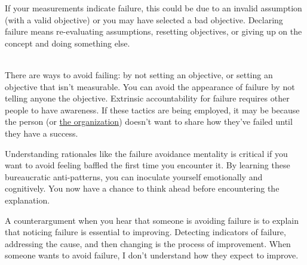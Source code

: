 If your measurements indicate failure, this could be due to an invalid assumption (with a valid objective) or you may have selected a bad objective. Declaring failure means re-evaluating assumptions, resetting objectives, or giving up on the concept and doing something else.

\ \\

There are ways to avoid failing: by not setting an objective, or setting an objective that isn't measurable. You can avoid the appearance of failure by not telling anyone the objective. Extrinsic accountability for failure requires other people to have awareness. If these tactics are being employed, it may be because the person (or
{}
\hyperref[sec:org-failure-and-success]{the organization}) doesn't want to share how they've failed until they have a success. 

Understanding rationales like the failure avoidance mentality is critical if you want to avoid feeling baffled the first time you encounter it. By learning these bureaucratic anti-patterns, you can inoculate yourself emotionally and cognitively. You now have a chance to think ahead before encountering the explanation.

A counterargument when you hear that someone is avoiding failure is to explain that noticing failure is essential to improving. Detecting indicators of failure, addressing the cause, and then changing is the process of improvement. When someone wants to avoid failure, I don't understand how they expect to improve. 

